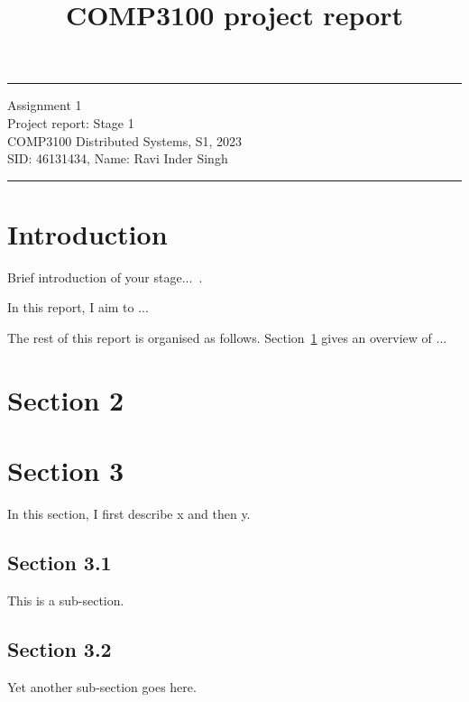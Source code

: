 \documentclass[a4paper]{article} %
\begin{document}
\title{COMP3100 project report} %
\fancyhead[C]{}
\hrule \medskip %
\begin{minipage}{1\textwidth} %
\centering 
\large %
Assignment 1 \\
Project report: Stage 1\\ %
COMP3100 Distributed Systems, S1, 2023\\
\normalsize %
SID: 46131434, Name: Ravi Inder Singh
\end{minipage}
\medskip\hrule %
\bigskip
\tableofcontents

\section*{Introduction}
Brief introduction of your stage...~\cite{mesos2011}.

In this report, I aim to ...

The rest of this report is organised as follows. Section~\ref{sec:section2} gives an overview of ...

\section{Section 2}
\label{sec:section2}

\section{Section 3}
\label{sec:section3}
In this section, I first describe x and then y.

\subsection{Section 3.1}
This is a sub-section.

\subsection{Section 3.2}
Yet another sub-section goes here.
\end{document}
